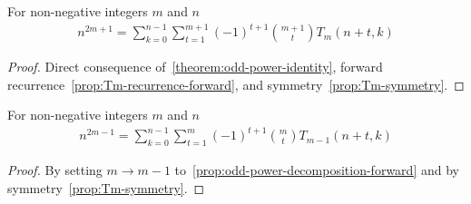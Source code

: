 \begin{proposition}
    \label{prop:odd-power-decomposition-forward-shifted}
    For non-negative integers $m$ and $n$
    \begin{align*}
        n^{2m+1} = \sum_{k=0}^{n-1} \sum_{t=1}^{m+1} (-1)^{t+1} \binom{m+1}{t} T_{m} (n+t, k)
    \end{align*}
    \begin{proof}
        Direct consequence of~\eqref{theorem:odd-power-identity},
        forward recurrence~\eqref{prop:Tm-recurrence-forward}, and symmetry~\eqref{prop:Tm-symmetry}.
    \end{proof}
\end{proposition}

\begin{proposition}
    \label{prop:odd-power-decomposition-forward-m-1-shifted}
    For non-negative integers $m$ and $n$
    \begin{align*}
        n^{2m-1} = \sum_{k=0}^{n-1} \sum_{t=1}^{m} (-1)^{t+1} \binom{m}{t} T_{m-1} (n+t, k)
    \end{align*}
    \begin{proof}
        By setting $m \rightarrow m-1$ to~\eqref{prop:odd-power-decomposition-forward} and
        by symmetry~\eqref{prop:Tm-symmetry}.
    \end{proof}
\end{proposition}
